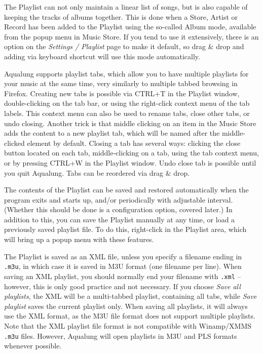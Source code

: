 \documentclass[10pt,english]{article}
\begin{document}
The Playlist can not only maintain a linear list of songs,
but is also capable of keeping the tracks of albums
together. This is done when a Store, Artist or Record has been
added to the Playlist using the so-called Album mode,
available from the popup menu in Music Store. If you tend to
use it extensively, there is an option on the
\textsl{Settings / Playlist} page to make it default, so drag
\& drop and adding via keyboard shortcut will use this mode
automatically.




Aqualung supports playlist tabs, which allow you to have
multiple playlists for your music at the same time, very
similarly to multiple tabbed browsing in Firefox. Creating new
tabs is possible via CTRL+T in the Playlist window,
double-clicking on the tab bar, or using the right-click
context menu of the tab labels. This context menu can also be
used to rename tabs, close other tabs, or undo
closing. Another trick is that middle clicking on an item in
the Music Store adds the content to a new playlist tab, which
will be named after the middle-clicked element by default.
Closing a tab has several ways: clicking the close button
located on each tab, middle-clicking on a tab, using the tab
context menu, or by pressing CTRL+W in the Playlist
window. Undo close tab is possible until you quit
Aqualung. Tabs can be reordered via drag \& drop.




The contents of the Playlist can be saved and restored
automatically when the program exits and starts up, and/or
periodically with adjustable interval. (Whether this should be
done is a configuration option, covered later.) In addition
to this, you can save the Playlist manually at any time, or
load a previously saved playlist file. To do this, right-click
in the Playlist area, which will bring up a popup menu with
these features.




The Playlist is saved as an XML file, unless you specify a
filename ending in \texttt{.m3u}, in which case it is
saved in M3U format (one filename per line). When saving an
XML playlist, you should
normally end your filename with \texttt{.xml} --
however, this is only good practice and not necessary. If you
choose \textsl{Save all playlists}, the XML will be a
multi-tabbed playlist, containing all tabs, while \textsl{Save
playlist} saves the current playlist only. When saving
all playlists, it will always use the XML format, as the M3U
file format does not support multiple playlists. Note that the
XML playlist file format is not compatible with Winamp/XMMS
\texttt{.m3u} files. However, Aqualung will open playlists
in M3U and PLS formats whenever possible.
\end{document}
